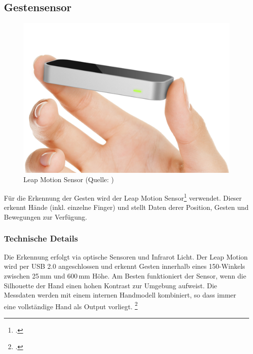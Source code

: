 \subsection{Gestensensor} \label{subsec:leapmotion}
\begin{figure}
	\includegraphics[width=1.0\linewidth]{images/analysis/leap_simple.png}
	\caption[Leap Motion Sensor]{Leap Motion Sensor (Quelle: )}
\end{figure}

Für die Erkennung der Gesten wird der Leap Motion Sensor\footcite{Leap_Motion_Motion_Controller_2015-03-27} verwendet.
Dieser erkennt Hände (inkl. einzelne Finger) und stellt Daten derer Position, Gesten und Bewegungen zur Verfügung.

\subsubsection{Technische Details}
Die Erkennung erfolgt via optische Sensoren und Infrarot Licht.
Der Leap Motion wird per USB 2.0 angeschlossen und erkennt Gesten innerhalb eines 150\textdegree-Winkels zwischen 25\,mm und 600\,mm Höhe.
Am Besten funktioniert der Sensor, wenn die Silhouette der Hand einen hohen Kontrast zur Umgebung aufweist.
Die Messdaten werden mit einem internen Handmodell kombiniert, so dass immer eine vollständige Hand als Output vorliegt.
\footcite{API_Overview__Leap_Motion_v2.2_documentation_2015-03-27}


